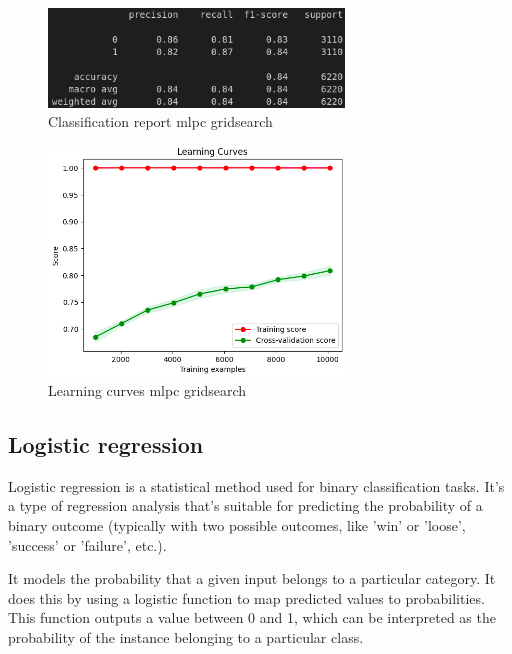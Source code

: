 \documentclass[a4paper,12pt]{article}
\begin{document}
\begin{figure}[H]
  \centering
  \includegraphics[width=0.7\textwidth]{./images/report_mlpc_gridsearch.png}
  \caption{Classification report mlpc gridsearch}
  \label{fig:report_mlpc_gridsearch}
\end{figure}

\begin{figure}[H]
  \centering
  \includegraphics[width=0.7\textwidth]{./images/lc_mlpc_gridsearch.png}
  \caption{Learning curves mlpc gridsearch}
  \label{fig:lc_mlpc_gridsearch}
\end{figure}

\subsection{Logistic regression}

Logistic regression is a statistical method used for binary classification tasks. It's a type of regression analysis that's suitable for predicting the probability of a binary outcome (typically with two possible outcomes, like 'win' or 'loose', 'success' or 'failure', etc.).

It models the probability that a given input belongs to a particular category. It does this by using a logistic function to map predicted values to probabilities. This function outputs a value between 0 and 1, which can be interpreted as the probability of the instance belonging to a particular class.\\
\end{document}
